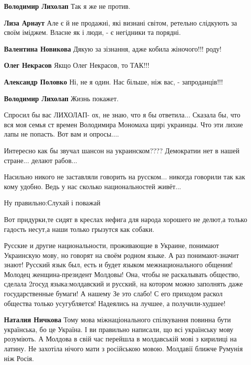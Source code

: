 \begin{itemize}
\begin{itemize}
\textbf{Володимир Лихолап} Так я же не против.

\textbf{Лиза Арнаут} Але є й не продажні, які визнані світом, ретельно слідкують за своїм іміджем. Власне як і люди, - є негідники та порядні.

\textbf{Валентина Новикова} Дякую за зізнання, адже кобила жіночого!!! роду!

\textbf{Олег Некрасов} Якщо Олег Некрасов, то ТАК!!!

\textbf{Александр Половко} Ні, не я один. Нас більше, ніж вас, - запроданців!!!

\textbf{Володимир Лихолап} Жизнь покажет.

Спросил бы вас ЛИХОЛАП- ох, не знаю, что я бы ответила... Сказала бы, что вся моя семья ст времен Володимира Мономаха щирi украинцы. Что эти лихие лапы не попасть. Вот вам и опросы....


\end{itemize}


Интересно как бы звучал шансон на украинском???? Демократии нет в нашей
стране... делают рабов...


Насильно никого не заставляли говорить на русском... никогда говорили так как
кому удобно. Ведь у нас сколько национальностей живёт...

Ну правильно:Слухай і поважай

Вот придурки,те сидят в креслах нефига для народа хорошего не делют,а только гадость несут,а наши только грызутся как собаки.


Русские и другие национальности, проживающие в Украине, понимают Украинскую
мову, но говорят на своём родном языке. А раз понимают-значит знают! Русский
язык был, есть и будет языком межнационального общения! Молодец
женщина-президент Молдовы! Она, чтобы не раскалывать общество, сделала 2госуд
языка:молдавский и русский, на котором можно заполнять даже государственные
бумаги! А нашему Зе это слабо! С его приходом раскол общества только
усугубляется! Надеялись на лучшее, а получили-худшее!

\begin{itemize}
\textbf{Наталия Ничкова} Тому мова міжнаціонального спілкування повинна бути
українська, бо це Україна. І ви правильно написали, що всі українську мову
розуміють. А Молдова в свій час перейшла в молдавській мові з кирилиці на
латину. Не захотіла нічого мати з російською мовою. Молдавії ближче Румунія ніж
Росія.


\end{itemize}
\end{itemize}
